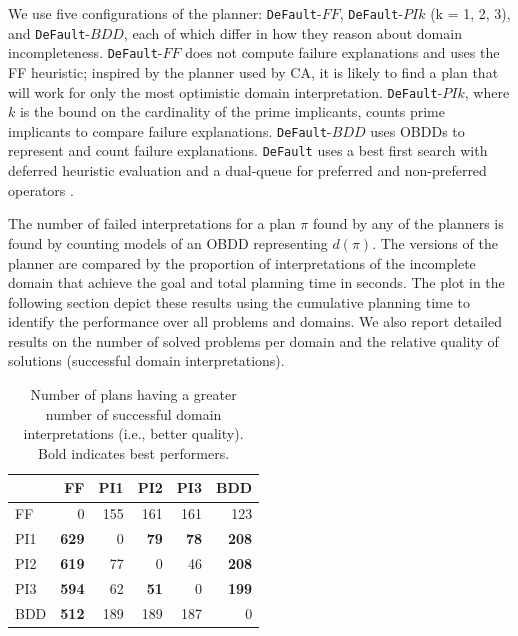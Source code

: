 \documentclass[letterpaper]{article}
\def\default{{\tt DeFault}}
\def\citep#1{\cite{#1}}
\begin{document}
   
We use five configurations of the planner: \default{}-$FF$, \default{}-$PIk$ (k
= 1, 2, 3), and \default{}-$BDD$, each of which differ in how they reason about
domain incompleteness.  \default{}-$FF$ does not compute failure explanations and uses
the FF heuristic; inspired by the planner used by CA, it is likely to find a plan that will work
for only the most optimistic domain interpretation.   \default{}-$PIk$, where
$k$ is the bound on the cardinality of the prime implicants, counts prime implicants to compare failure
explanations.  \default{}-$BDD$ uses OBDDs to represent and count failure
explanations.  \default{} uses a  best first search with deferred heuristic evaluation
and a dual-queue for preferred and non-preferred operators
\citep{DBLP:journals/jair/Helmert06}.  

The number of failed interpretations for a plan $\pi$ found by
any of the planners is found by counting models of an OBDD
representing $d(\pi)$. The versions of the planner are compared by the
proportion of interpretations of the incomplete domain that achieve the goal and
total planning time in seconds. The plot in the following section depict these
results using the cumulative
planning time to identify the performance over all problems and domains.  We
also report detailed results on the number of solved problems per domain and the
relative quality of solutions (successful domain interpretations).


\begin{table}[t]
\centering 
\begin{tabular}{|l|rrrrr|}      \hline &  FF  & PI1 & PI2  &  PI3  &  BDD  \\\hline
FF	&		0		&		155		&		161		&		161		&		123		\\
PI1	&	{\bf	629}	&		0		&	{\bf	79}	&	{\bf	78}	&	{\bf	208}	\\
PI2	&	{\bf	619}	&		77		&		0		&		46		&	{\bf	208}	\\
PI3	&	{\bf	594}	&		62		&	{\bf	51}	&		0		&	{\bf	199}	\\
BDD & {\bf 512} &  189  &  189  &  187  &  0  \\\hline
\end{tabular}																						
\caption{\label{tab:qualcomp} Number of plans having a greater
number of successful domain interpretations (i.e., better quality). Bold
indicates best performers.}
\end{table}
\end{document}
